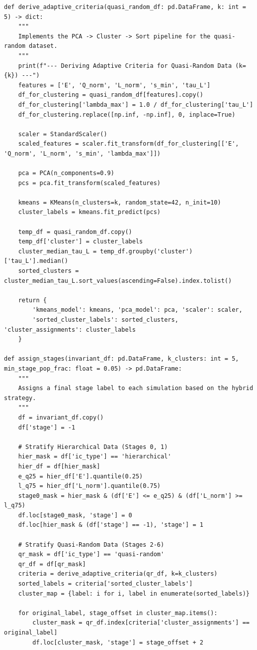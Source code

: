 \documentclass[11pt, letterpaper]{article}
\begin{document}
\begin{lstlisting}
def derive_adaptive_criteria(quasi_random_df: pd.DataFrame, k: int = 5) -> dict:
    """
    Implements the PCA -> Cluster -> Sort pipeline for the quasi-random dataset.
    """
    print(f"--- Deriving Adaptive Criteria for Quasi-Random Data (k={k}) ---")
    features = ['E', 'Q_norm', 'L_norm', 's_min', 'tau_L']
    df_for_clustering = quasi_random_df[features].copy()
    df_for_clustering['lambda_max'] = 1.0 / df_for_clustering['tau_L']
    df_for_clustering.replace([np.inf, -np.inf], 0, inplace=True)
    
    scaler = StandardScaler()
    scaled_features = scaler.fit_transform(df_for_clustering[['E', 'Q_norm', 'L_norm', 's_min', 'lambda_max']])
    
    pca = PCA(n_components=0.9)
    pcs = pca.fit_transform(scaled_features)
    
    kmeans = KMeans(n_clusters=k, random_state=42, n_init=10)
    cluster_labels = kmeans.fit_predict(pcs)
    
    temp_df = quasi_random_df.copy()
    temp_df['cluster'] = cluster_labels
    cluster_median_tau_L = temp_df.groupby('cluster')['tau_L'].median()
    sorted_clusters = cluster_median_tau_L.sort_values(ascending=False).index.tolist()
    
    return {
        'kmeans_model': kmeans, 'pca_model': pca, 'scaler': scaler,
        'sorted_cluster_labels': sorted_clusters, 'cluster_assignments': cluster_labels
    }

def assign_stages(invariant_df: pd.DataFrame, k_clusters: int = 5, min_stage_pop_frac: float = 0.05) -> pd.DataFrame:
    """
    Assigns a final stage label to each simulation based on the hybrid strategy.
    """
    df = invariant_df.copy()
    df['stage'] = -1
    
    # Stratify Hierarchical Data (Stages 0, 1)
    hier_mask = df['ic_type'] == 'hierarchical'
    hier_df = df[hier_mask]
    e_q25 = hier_df['E'].quantile(0.25)
    l_q75 = hier_df['L_norm'].quantile(0.75)
    stage0_mask = hier_mask & (df['E'] <= e_q25) & (df['L_norm'] >= l_q75)
    df.loc[stage0_mask, 'stage'] = 0
    df.loc[hier_mask & (df['stage'] == -1), 'stage'] = 1

    # Stratify Quasi-Random Data (Stages 2-6)
    qr_mask = df['ic_type'] == 'quasi-random'
    qr_df = df[qr_mask]
    criteria = derive_adaptive_criteria(qr_df, k=k_clusters)
    sorted_labels = criteria['sorted_cluster_labels']
    cluster_map = {label: i for i, label in enumerate(sorted_labels)}
    
    for original_label, stage_offset in cluster_map.items():
        cluster_mask = qr_df.index[criteria['cluster_assignments'] == original_label]
        df.loc[cluster_mask, 'stage'] = stage_offset + 2


\end{lstlisting}
\end{document}
